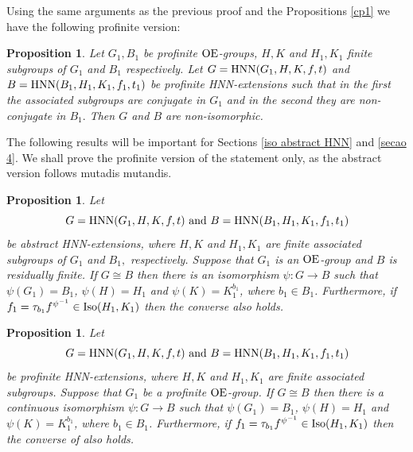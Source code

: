 \documentclass[a4paper,12pt]{article}
\newtheorem{prop}[thm]{Proposition}
\def\OE{{\rm OE}}
\def\hnn {{\rm HNN}}
\def\Iso {{\rm Iso}}
\begin{document}
{Using the same arguments as the previous proof and the Propositions \ref{cp1} %
we have the following profinite version: 

\begin{prop} \label{normal non iso nao normal profinite}
Let $G_1, B_1$ be profinite $\OE$-groups, $H, K$ and $H_1, K_1$ finite  subgroups of $G_1$ and $B_1$ respectively. Let $G= \hnn(G_1, H, K,  f,  t)$ and $B=\hnn(B_1, H_1, K_1, f_1, t_1)$ be profinite HNN-extensions such that in the first the associated subgroups are conjugate in $G_1$ and in the second they are non-conjugate in $B_1.$ Then $G$ and $B$ are non-isomorphic.  
\end{prop} 




The following results will be important  for Sections \ref{iso abstract HNN} and \ref{secao 4}. We shall prove the profinite version of the  statement only, as the abstract version follows mutadis mutandis. 

\begin{prop}\label{fixed hnn abstract} Let $$G = \hnn(G_{1}, H,K, f, t)\  {\rm and}\  B = \hnn(B_{1}, H_1, K_1, f_1, t_1)$$ be abstract HNN-extensions, where $H, K$ and $H_1, K_1$ are finite associated subgroups of $G_1$ and $B_1,$ respectively.  Suppose that $G_1$ is an $\OE$-group and $B$ is residually finite. If $G\cong B$ then there is an isomorphism $\psi: G \longrightarrow B$ such that $\psi(G_1)= B_1$, $\psi(H)=H_1$ and $\psi(K)= K_{1}^{b_1}$, where $ b_1\in B_1$. Furthermore, if $f_1=\tau_{b_1}f^{\psi^{-1}}\in \Iso(H_1,K_1)$ then the converse also holds.
\end{prop}

\begin{prop}\label{2a} Let $$G = \hnn(G_{1}, H,K, f, t)\  {\rm and}\  B = \hnn(B_{1}, H_1, K_1, f_1,\\ t_1)$$ be profinite HNN-extensions, where $H, K$ and $H_1, K_1$ are finite associated subgroups.  Suppose that $G_1$ be a profinite  $\OE$-group.  If $G\cong B$ then there is a continuous isomorphism $\psi: G \longrightarrow B$ such that $\psi(G_1)= B_1$, $\psi(H)=H_1$ and $\psi(K)= K_{1}^{b_1}$, where $ b_1\in B_1$. Furthermore, if $f_1=\tau_{b_1}f^{\psi^{-1}}\in \Iso(H_1,K_1)$ then the converse of also holds.
\end{prop}

}
\end{document}
